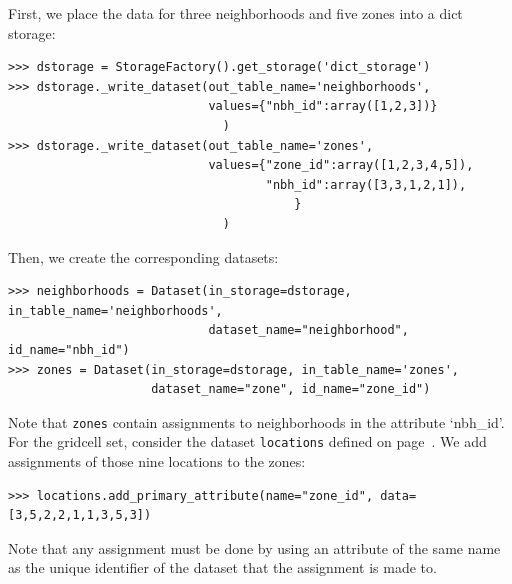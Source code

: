 First, we place the data for three neighborhoods and five zones into a dict storage:
\begin{verbatim}
>>> dstorage = StorageFactory().get_storage('dict_storage')
>>> dstorage._write_dataset(out_table_name='neighborhoods',
                            values={"nbh_id":array([1,2,3])}
                              )
>>> dstorage._write_dataset(out_table_name='zones',
                            values={"zone_id":array([1,2,3,4,5]),
                                    "nbh_id":array([3,3,1,2,1]),
                                        }
                              )
\end{verbatim}

Then, we create the corresponding datasets: \datasetindex
\begin{verbatim}
>>> neighborhoods = Dataset(in_storage=dstorage, in_table_name='neighborhoods',
                            dataset_name="neighborhood", id_name="nbh_id")
>>> zones = Dataset(in_storage=dstorage, in_table_name='zones',
                    dataset_name="zone", id_name="zone_id")
\end{verbatim}
Note that \verb|zones| contain assignments to neighborhoods in the
attribute `nbh_id'.  For the gridcell set, consider the dataset \datasetindex
\verb|locations| defined on page~\pageref{page:tutorial-gc-locations}. We
add assignments of those nine locations to the zones:
\primaryattributesindex
\begin{verbatim}
>>> locations.add_primary_attribute(name="zone_id", data=[3,5,2,2,1,1,3,5,3])
\end{verbatim}
Note that any assignment must be done by using an attribute \attributesindex of the same name
as the unique identifier of the dataset \datasetindex that the assignment is made to.

